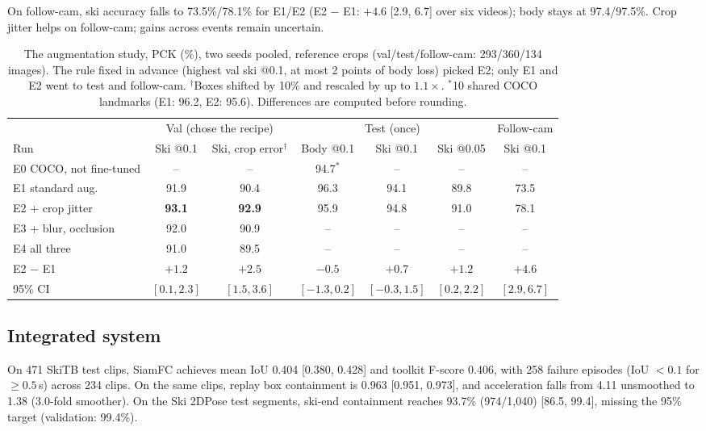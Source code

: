 \documentclass{article}
\begin{document}
On follow-cam, ski accuracy falls to 73.5\%/78.1\% for E1/E2 (E2 $-$ E1: $+4.6$ [2.9,
6.7] over six videos); body stays at 97.4/97.5\%. Crop jitter helps on follow-cam; gains across events
remain uncertain.

\begin{table}[h]
  \centering
  \small
  \setlength{\tabcolsep}{3.5pt}
  \begin{tabular}{lcc|ccc|c}
    \toprule
    & \multicolumn{2}{c|}{Val (chose the recipe)} & \multicolumn{3}{c|}{Test (once)} & Follow-cam \\
    Run & Ski @0.1 & Ski, crop error$^{\dagger}$ & Body @0.1 & Ski @0.1 & Ski @0.05 & Ski @0.1 \\
    \midrule
    E0 COCO, not fine-tuned & -- & -- & 94.7$^{*}$ & -- & -- & -- \\
    E1 standard aug. & 91.9 & 90.4 & 96.3 & 94.1 & 89.8 & 73.5 \\
    E2 + crop jitter & \textbf{93.1} & \textbf{92.9} & 95.9 & 94.8 & 91.0 & 78.1 \\
    E3 + blur, occlusion & 92.0 & 90.9 & -- & -- & -- & -- \\
    E4 all three & 91.0 & 89.5 & -- & -- & -- & -- \\
    \midrule
    E2 $-$ E1 & $+1.2$ & $+2.5$ & $-0.5$ & $+0.7$ & $+1.2$ & $+4.6$ \\
    {\scriptsize 95\% CI} & {\scriptsize $[0.1, 2.3]$} & {\scriptsize $[1.5, 3.6]$} & {\scriptsize $[-1.3, 0.2]$}
      & {\scriptsize $[-0.3, 1.5]$} & {\scriptsize $[0.2, 2.2]$} & {\scriptsize $[2.9, 6.7]$} \\
    \bottomrule
  \end{tabular}
  \caption{The augmentation study, PCK (\%), two seeds pooled, reference crops (val/test/follow-cam: 293/360/134
  images). The rule fixed in advance (highest val ski @0.1, at most 2 points of body loss) picked E2; only E1 and E2
  went to test and follow-cam. $^{\dagger}$Boxes shifted by 10\% and rescaled by up to $1.1\times$. $^{*}$10 shared
  COCO landmarks (E1: 96.2, E2: 95.6). Differences are computed before rounding.}
  \label{tab:pose}
\end{table}

\subsection{Integrated system}
\label{sec:system}
On 471 SkiTB test clips, SiamFC achieves mean IoU 0.404 [0.380, 0.428] and toolkit F-score 0.406, with
258 failure episodes (IoU $<0.1$ for $\ge0.5$\,s) across 234 clips. On the same clips, replay box containment is
0.963 [0.951, 0.973], and acceleration falls from 4.11 unsmoothed to 1.38 (3.0-fold smoother). On the
Ski 2DPose test segments, ski-end containment reaches 93.7\% (974/1,040) [86.5, 99.4], missing the 95\% target
(validation: 99.4\%).
\end{document}
